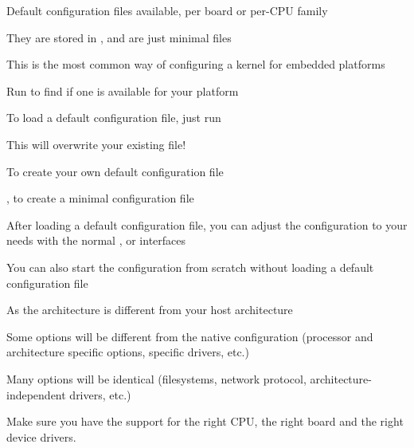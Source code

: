   \startitemize
  \item Default configuration files available, per board or per-CPU
    family
    \startitemize
    \item They are stored in , and are
      just minimal  files
    \item This is the most common way of configuring a kernel for
      embedded platforms
    \stopitemize
  \item Run  to find if one is available for your
    platform
  \item To load a default configuration file, just run\\
    \startitemize
    \item This will overwrite your existing  file!
    \stopitemize
  \item To create your own default configuration file
    \startitemize
    \item {}, to create a minimal
      configuration file
    \item {}
    \stopitemize
  \stopitemize

  \startitemize
  \item After loading a default configuration file, you can adjust the
    configuration to your needs with the normal ,
     or  interfaces
  \item You can also start the configuration from scratch without
    loading a default configuration file
  \item As the architecture is different from your host architecture
    \startitemize
    \item Some options will be different from the native configuration
      (processor and architecture specific options, specific drivers,
      etc.)
    \item Many options will be identical (filesystems, network
      protocol, architecture-independent drivers, etc.)
    \stopitemize
  \item Make sure you have the support for the right CPU, the right
    board and the right device drivers.
  \stopitemize

